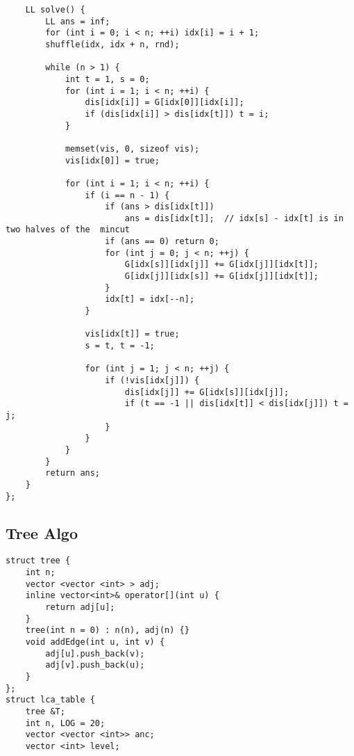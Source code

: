 \documentclass[FSZ,a4paper,onesided]{article}
\begin{document}
\begin{multicols*}{\COLS}
\begin{lstlisting}
    LL solve() {
        LL ans = inf;
        for (int i = 0; i < n; ++i) idx[i] = i + 1;
        shuffle(idx, idx + n, rnd);

        while (n > 1) {
            int t = 1, s = 0;
            for (int i = 1; i < n; ++i) {
                dis[idx[i]] = G[idx[0]][idx[i]];
                if (dis[idx[i]] > dis[idx[t]]) t = i;
            }

            memset(vis, 0, sizeof vis);
            vis[idx[0]] = true;

            for (int i = 1; i < n; ++i) {
                if (i == n - 1) {
                    if (ans > dis[idx[t]])
                        ans = dis[idx[t]];  // idx[s] - idx[t] is in two halves of the  mincut
                    if (ans == 0) return 0;
                    for (int j = 0; j < n; ++j) {
                        G[idx[s]][idx[j]] += G[idx[j]][idx[t]];
                        G[idx[j]][idx[s]] += G[idx[j]][idx[t]];
                    }
                    idx[t] = idx[--n];
                }

                vis[idx[t]] = true;
                s = t, t = -1;

                for (int j = 1; j < n; ++j) {
                    if (!vis[idx[j]]) {
                        dis[idx[j]] += G[idx[s]][idx[j]];
                        if (t == -1 || dis[idx[t]] < dis[idx[j]]) t = j;
                    }
                }
            }
        }
        return ans;
    }
};\end{lstlisting}
\subsection{Tree Algo}
\begin{lstlisting}
struct tree {
    int n;
    vector <vector <int> > adj;
    inline vector<int>& operator[](int u) {
        return adj[u];
    }
    tree(int n = 0) : n(n), adj(n) {}
    void addEdge(int u, int v) {
        adj[u].push_back(v);
        adj[v].push_back(u);
    }
};
struct lca_table {
    tree &T;
    int n, LOG = 20;
    vector <vector <int>> anc;
    vector <int> level;


\end{lstlisting}
\end{multicols*}
\end{document}
